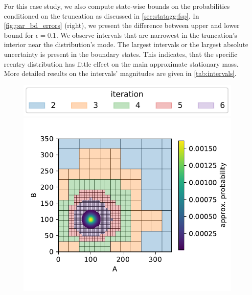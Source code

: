 For this case study, we also compute state-wise bounds on the probabilities conditioned on the truncation as discussed in \autoref{sec:statagg:fsp}.
In \autoref{fig:par_bd_errors} (right), we present the difference between upper and lower bound for $\epsilon=0.1$.
We observe intervals that are narrowest in the truncation's interior near the distribution's mode.
The largest intervals or the largest absolute uncertainty is present in the boundary states.
This indicates, that the specific reentry distribution has little effect on the main approximate stationary mass.
More detailed results on the intervals' magnitudes are given in \autoref{tab:intervals}.
\begin{figure}[t]
    \centering
    \begin{minipage}{.48\textwidth}
    \centering
    \includegraphics[scale=0.5]{gfx/iteration_legend.pdf}\\
    \vspace{-5mm}
    \includegraphics[width=\textwidth]{gfx/parbd_truncs.pdf}
    \end{minipage}
    \begin{minipage}{.43\textwidth}

\end{minipage}
\end{figure}
